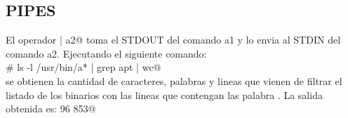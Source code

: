 		\subsection{PIPES}
		\noindent El operador  | a2@ toma el STDOUT del comando a1 y lo envia al STDIN del comando a2.
		Ejecutando el siguiente comando:\\
		\verb@# ls -l /usr/bin/a* | grep apt | wc@\\
		se obtienen la cantidad de caracteres, palabras y lineas que vienen de filtrar el listado de los binarios con las lineas que contengan las palabra \verb@sync@.  La salida obtenida es:	 96 853@
